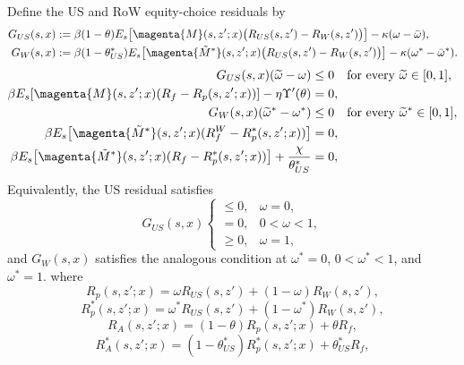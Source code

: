 \documentclass{article}
\def\green#1{#1}%
\begin{document}
\green{Define the US and RoW equity-choice residuals by}
\begin{align*}
\green{G}_{\green{US}}(\green{s},\green{x})
:\green{=}{}&
\beta(1-\theta)
E_s\!\left[\magenta{M}(s,z';x)
\bigl(R_{US}(s,z')-R_W(s,z')\bigr)\right]
-\kappa(\omega-\bar\omega),\\
\green{G}_\green{W}(\green{s},\green{x})
:\green{=}{}&
\green{\beta}(\green{1-\theta}_{\green{US}}^*)
\green{E}_\green{s}\!\left[\magenta{\green{\tilde M}^*}(\green{s},\green{z}';\green{x})
\bigl(\green{R}_{\green{US}}(\green{s},\green{z}')\green{-R}_\green{W}(\green{s},\green{z}')\bigr)\right]
\green{-\kappa}(\green{\omega}^*\green{-}\green{\bar\omega}^*).
\end{align*}
\begin{align}
\green{G}_{\green{US}}(\green{s},\green{x})(\green{\widetilde\omega-\omega})&\green{\le0}
\quad\text{\green{for every} }\green{\widetilde\omega\in}[0,\green{1}],
\label{intratemporal_omega_US}\\
\beta
E_s\!\left[\magenta{M}(s,z';x)
(R_f-R_p(s,z';x))\right]
-\eta\Upsilon'(\theta)&=0,
\label{intratemporal_theta_US}\\
\green{G}_W(s,\green{x})(\widetilde\omega^*-\omega^*)&\green{\le0}
\quad\text{\green{for every} }\green{\widetilde\omega}^*\green{\in}[0,\green{1}],
\label{intratemporal_omega_W}\\
\beta E_s\!\left[\magenta{\tilde M^*}(s,z';x)
(R_f^W-R_p^*(s,z';x))\right]&=0,
\label{intratemporal_thetaW}\\
\beta E_s\!\left[\magenta{\tilde M^*}(s,z';x)
(R_f-R_p^*(s,z';x))\right]
+\frac{\chi}{\theta_{US}^*}&=0,
\label{intratemporal_thetaUS}
\end{align}
\green{Equivalently}, \green{the US residual satisfies}
\[
\green{G}_{\green{US}}(\green{s},\green{x})
\begin{cases}
\green{\le0}, & \green{\omega=0},\\
\green{=0}, & \green{0<\omega<1},\\
\green{\ge0}, & \green{\omega=1},
\end{cases}
\]
\green{and} $\green{G}_\green{W}(\green{s},\green{x})$ \green{satisfies the analogous condition at} $\green{\omega}^*\green{=0}$, $\green{0<\omega}^*\green{<1}$, \green{and} $\green{\omega}^*\green{=1}$.
where
\[
R_p(s,z';x)=\omega R_{US}(s,z')+(1-\omega)R_W(s,z'),
\]
\[
R_p^*(s,z';x)=\omega^*R_{US}(s,z')+(1-\omega^*)R_W(s,z'),
\]
\[
R_A(s,z';x)=(1-\theta)R_p(s,z';x)+\theta R_f,
\]
\[
R_A^*(s,z';x)
=(1-\theta_{US}^*)R_p^*(s,z';x)
+\theta_{US}^*R_f,
\]
\end{document}
